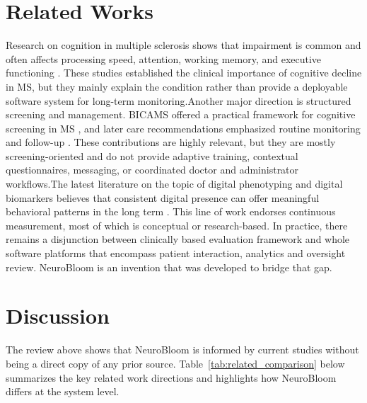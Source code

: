 \documentclass[12pt,a4paper]{report}
\begin{document}
\section{Related Works}
Research on cognition in multiple sclerosis shows that impairment is common and often affects processing speed, attention, working memory, and executive functioning \cite{chiaravalloti2008,amato2006,rocca2015}. These studies established the clinical importance of cognitive decline in MS, but they mainly explain the condition rather than provide a deployable software system for long-term monitoring.Another major direction is structured screening and management. BICAMS offered a practical framework for cognitive screening in MS \cite{benedict2012}, and later care recommendations emphasized routine monitoring and follow-up \cite{kalb2018}. These contributions are highly relevant, but they are mostly screening-oriented and do not provide adaptive training, contextual questionnaires, messaging, or coordinated doctor and administrator workflows.The latest literature on the topic of digital phenotyping and digital biomarkers believes that consistent digital presence can offer meaningful behavioral patterns in the long term  \cite{insel2017,dorsey2017,coravos2019}.  This line of work endorses continuous measurement, most of which is conceptual or research-based. In practice, there remains a disjunction between clinically based evaluation framework and whole software platforms that encompass patient interaction, analytics and oversight review. NeuroBloom is an invention that was developed to bridge that gap.



\section{Discussion}
The review above shows that NeuroBloom is informed by current studies without being a direct copy of any prior source. Table~\ref{tab:related_comparison} below summarizes the key related work directions and highlights how NeuroBloom differs at the system level.
\end{document}
